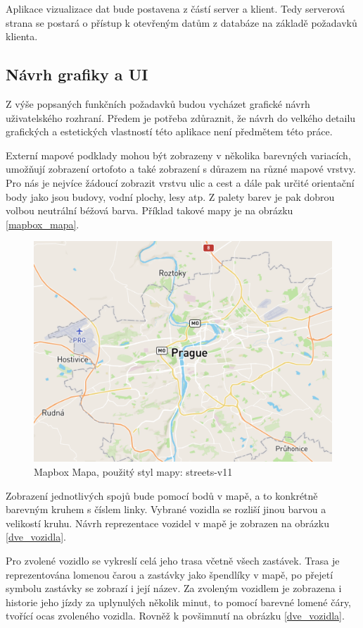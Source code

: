  Aplikace vizualizace dat bude postavena z částí server a klient. Tedy serverová strana se postará o přístup k otevřeným datům z databáze na základě požadavků klienta.


\subsection{Návrh grafiky a UI}


Z výše popsaných funkčních požadavků budou vycházet grafické návrh uživatelského rozhraní. Předem je potřeba zdůraznit, že návrh do velkého detailu grafických a estetických vlastností této aplikace není předmětem této práce.


\bigbreak


Externí mapové podklady mohou být zobrazeny v několika barevných variacích, umožňují zobrazení ortofoto a také zobrazení s důrazem na různé mapové vrstvy. Pro nás je nejvíce žádoucí zobrazit vrstvu ulic a cest a dále pak určité orientační body jako jsou budovy, vodní plochy, lesy atp. Z palety barev je pak dobrou volbou neutrální béžová barva. Příklad takové mapy je na obrázku \ref{mapbox_mapa}.


\begin{figure}
\centering
  \includegraphics[width=0.5\linewidth]{../img/mapa_mapbox.png}
  \caption{Mapbox Mapa, použitý styl mapy: streets-v11}
  \label{fig:mapbox_mapa}
\end{figure}


Zobrazení jednotlivých spojů bude pomocí bodů v mapě, a to konkrétně barevným kruhem s číslem linky. Vybrané vozidla se rozliší jinou barvou a velikostí kruhu. Návrh reprezentace vozidel v mapě je zobrazen na obrázku \ref{dve_vozidla}.


\bigbreak


Pro zvolené vozidlo se vykreslí celá jeho trasa včetně všech zastávek. Trasa je reprezentována lomenou čarou a zastávky jako špendlíky v mapě, po přejetí symbolu zastávky se zobrazí i její název. Za zvoleným vozidlem je zobrazena i historie jeho jízdy za uplynulých několik minut, to pomocí barevné lomené čáry, tvořící ocas zvoleného vozidla. Rovněž k povšimnutí na obrázku \ref{dve_vozidla}.


